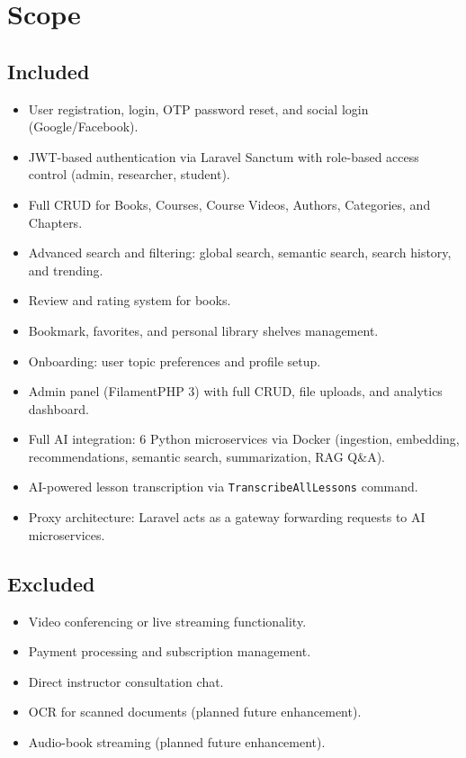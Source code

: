 \section{Scope}
\label{sec:ch4scope}

\subsection{Included}

\begin{itemize}
  \item User registration, login, OTP password reset, and social login
        (Google/Facebook).
  \item JWT-based authentication via Laravel Sanctum with role-based access
        control (admin, researcher, student).
  \item Full CRUD for Books, Courses, Course Videos, Authors, Categories, and
        Chapters.
  \item Advanced search and filtering: global search, semantic search, search
        history, and trending.
  \item Review and rating system for books.
  \item Bookmark, favorites, and personal library shelves management.
  \item Onboarding: user topic preferences and profile setup.
  \item Admin panel (FilamentPHP 3) with full CRUD, file uploads, and analytics
        dashboard.
  \item Full AI integration: 6 Python microservices via Docker (ingestion,
        embedding, recommendations, semantic search, summarization, RAG Q\&A).
  \item AI-powered lesson transcription via \texttt{TranscribeAllLessons}
        command.
  \item Proxy architecture: Laravel acts as a gateway forwarding requests to
        AI microservices.
\end{itemize}

\subsection{Excluded}

\begin{itemize}
  \item Video conferencing or live streaming functionality.
  \item Payment processing and subscription management.
  \item Direct instructor consultation chat.
  \item OCR for scanned documents (planned future enhancement).
  \item Audio-book streaming (planned future enhancement).
\end{itemize}

